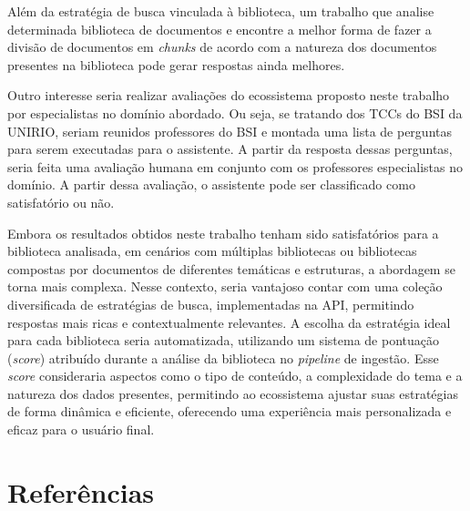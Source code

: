 \documentclass[a4paper, 12pt]{article}
\begin{document}
    Além da estratégia de busca vinculada à biblioteca, um trabalho que analise determinada biblioteca de documentos e encontre a melhor forma de fazer a divisão de documentos em \textit{chunks} de acordo com a natureza dos documentos presentes na biblioteca pode gerar respostas ainda melhores.

    Outro interesse seria realizar avaliações do ecossistema proposto neste trabalho por especialistas no domínio abordado. Ou seja, se tratando dos TCCs do BSI da UNIRIO, seriam reunidos professores do BSI e montada uma lista de perguntas para serem executadas para o assistente. A partir da resposta dessas perguntas, seria feita uma avaliação humana em conjunto com os professores especialistas no domínio. A partir dessa avaliação, o assistente pode ser classificado como satisfatório ou não.

    Embora os resultados obtidos neste trabalho tenham sido satisfatórios para a biblioteca analisada, em cenários com múltiplas bibliotecas ou bibliotecas compostas por documentos de diferentes temáticas e estruturas, a abordagem se torna mais complexa. Nesse contexto, seria vantajoso contar com uma coleção diversificada de estratégias de busca, implementadas na API, permitindo respostas mais ricas e contextualmente relevantes. A escolha da estratégia ideal para cada biblioteca seria automatizada, utilizando um sistema de pontuação (\textit{score}) atribuído durante a análise da biblioteca no \textit{pipeline} de ingestão. Esse \textit{score} consideraria aspectos como o tipo de conteúdo, a complexidade do tema e a natureza dos dados presentes, permitindo ao ecossistema ajustar suas estratégias de forma dinâmica e eficiente, oferecendo uma experiência mais personalizada e eficaz para o usuário final.

    \clearpage

    \section{Referências}

    \nocite{*}

    \sectionfont{\raggedright}
    \printbibliography
    
\end{document}
